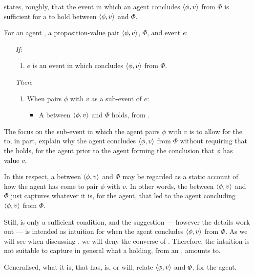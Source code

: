 \begin{note}
  \supportI{} states, roughly, that the event in which an agent concludes \(\langle \phi, v \rangle\) from \(\Phi\) is sufficient for a \ros{} to hold between \(\langle \phi, v \rangle\) and \(\Phi\).

  \begin{idea}[\supportI{}]
    \label{idea:support}
    For an agent \vAgent{}, a proposition-value pair \(\langle \phi, v \rangle\), \poP{} \(\Phi\), and event \(e\):

    \begin{itemize}
    \item[\emph{If}:]
      \begin{enumerate}[label=\alph*., ref=(\alph*)]
      \item
        \(e\) is an event in which \vAgent{} concludes \(\langle \phi, v \rangle\) from \(\Phi\).
      \end{enumerate}
    \item[\emph{Then}:]
      \begin{enumerate}[label=\alph*., ref=(\alph*), resume]
      \item
        When \vAgent{} pairs \(\phi\) with \(v\) as a sub-event of \(e\):
        \begin{itemize}
        \item
          A \emph{\ros{}} between \(\langle \phi, v \rangle\) and \(\Phi\) holds, from .
        \end{itemize}
      \end{enumerate}
    \end{itemize}
    \vspace{-\baselineskip}
  \end{idea}

  The focus on the sub-event in which the agent pairs \(\phi\) with \(v\) is to allow for the \ros{} to, in part, explain why the agent concludes \(\langle \phi, v \rangle\) from \(\Phi\) without requiring that the \ros{} holds, for the agent prior to the agent forming the conclusion that \(\phi\) has value \(v\).

  In this respect, a \ros{} between \(\langle \phi, v \rangle\) and \(\Phi\) may be regarded as a static account of how the agent has come to pair \(\phi\) with \(v\).
  In other words, the \ros{} between \(\langle \phi, v \rangle\) and \(\Phi\) just captures whatever it is, for the agent, that led to the agent concluding \(\langle \phi, v \rangle\) from \(\Phi\).

  Still, \supportI{} is only a sufficient condition, and the suggestion --- however the details work out --- is intended as intuition for when the agent concludes \(\langle \phi, v \rangle\) from \(\Phi\).
  As we will see when discussing \supportII{}, we will deny the converse of \supportI{}.
  Therefore, the intuition is not suitable to capture in general what a \ros{} holding, from an \agpe{}, amounts to.

  Generalised, what it is, that has, is, or will, relate \(\langle \phi, v \rangle\) and \(\Phi\), for the agent.
\end{note}

